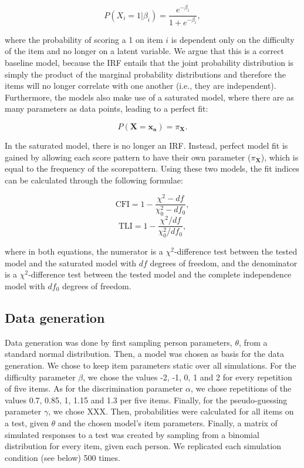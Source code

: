 \documentclass[Royal,sageapa,times,doublespace]{sagej}
\begin{document}
\begin{equation}
P(X_i = 1 | \beta_{i}) = \frac{e^{- \beta_{i}}}{1 + e^{- \beta_{i}}},
\end{equation}

where the probability of scoring a 1 on item $i$ is dependent only on the difficulty of the item and no longer on a latent variable. We argue that this is a correct baseline model, because the IRF entails that the joint probability distribution is simply the product of the marginal probability distributions and therefore the items will no longer correlate with one another (i.e., they are independent). Furthermore, the models also make use of a saturated model, where there are as many parameters as data points, leading to a perfect fit:

\begin{equation}
P(\boldsymbol{X} = \boldsymbol{x_a}) = \pi_{\boldsymbol{X}}.
\end{equation}

In the saturated model, there is no longer an IRF. Instead, perfect model fit is gained by allowing each score pattern to have their own parameter ($\pi_{\boldsymbol{X}}$), which is equal to the frequency of the scorepattern. Using these two models, the fit indices can be calculated through the following formulae:

\begin{equation}
\text{CFI} = 1 - \frac{\chi^{2} - df}{\chi^{2}_{0} - df_0},
\end{equation}
\begin{equation}
\text{TLI} = 1 - \frac{\chi^{2}/df}{\chi^{2}_{0}/df_0},
\end{equation}

where in both equations, the numerator is a $\chi^2$-difference test between the tested model and the saturated model with $df$ degrees of freedom, and the denominator is a $\chi^2$-difference test between the tested model and the complete independence model with $df_0$ degrees of freedom.

\subsection{Data generation}
Data generation was done by first sampling person parameters, $\theta$, from a standard normal distribution. Then, a model was chosen as basis for the data generation. We chose to keep item parameters static over all simulations. For the difficulty parameter $\beta$, we chose the values -2, -1, 0, 1 and 2 for every repetition of five items. As for the discrimination parameter $\alpha$, we chose repetitions of the values 0.7, 0.85, 1, 1.15 and 1.3 per five items. Finally, for the pseudo-guessing parameter $\gamma$, we chose XXX. Then, probabilities were calculated for all items on a test, given $\theta$ and the chosen model's item parameters. Finally, a matrix of simulated responses to a test was created by sampling from a binomial distribution for every item, given each person. We replicated each simulation condition (see below) 500 times.
\end{document}
